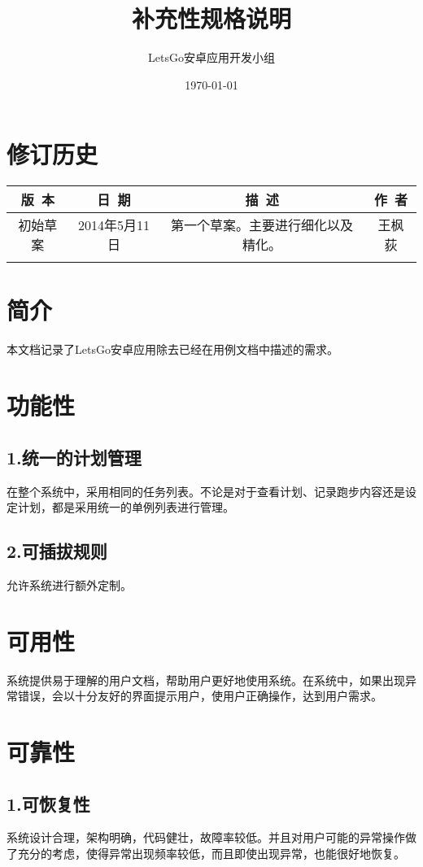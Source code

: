 \documentclass [a4paper,11pt]{article}
\title{补充性规格说明}
\date{\today}
\author{LetsGo安卓应用开发小组}
\begin{document}
	
\maketitle
\section*{修订历史}

\begin{table}[!hbp]
\centering

\begin{tabular*}{\textwidth}{c|c|c|c}
\hline
\rule{0pt}{0.8cm}
版~本 & 日~期 & 描~述 & 作~者\\
\hline
\rule{0pt}{0.6cm}
初始草案 & 2014年5月11日 & 第一个草案。主要进行细化以及精化。 & 王枫荻\\
\hline
\rule{0pt}{0.6cm}
 &  &  & \\
\hline
\end{tabular*}

\end{table}

\section*{简介}
本文档记录了LetsGo安卓应用除去已经在用例文档中描述的需求。
\section*{功能性}
\subsection*{1.统一的计划管理}
在整个系统中，采用相同的任务列表。不论是对于查看计划、记录跑步内容还是设定计划，都是采用统一的单例列表进行管理。
\subsection*{2.可插拔规则}
允许系统进行额外定制。
\section*{可用性}
系统提供易于理解的用户文档，帮助用户更好地使用系统。在系统中，如果出现异常错误，会以十分友好的界面提示用户，使用户正确操作，达到用户需求。
\section*{可靠性}
\subsection*{1.可恢复性}
系统设计合理，架构明确，代码健壮，故障率较低。并且对用户可能的异常操作做了充分的考虑，使得异常出现频率较低，而且即使出现异常，也能很好地恢复。
\end{document}
